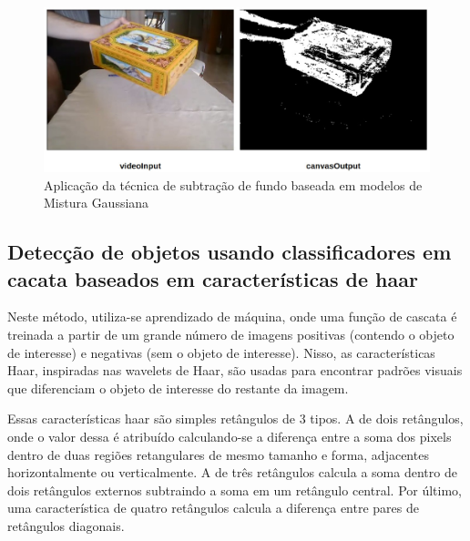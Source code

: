 \documentclass[12pt, %
openright, 
oneside, %
a4paper,    %
brazil]{facom-ufu-abntex2}
\begin{document}

\begin{figure}[ht]
	\begin{center}

		\includegraphics[width=0.7\linewidth]{background_subtraction.jpeg}
	\end{center}
	\caption{Aplicação da técnica de subtração de fundo baseada em modelos
		de Mistura Gaussiana}
\end{figure}

\subsection{Detecção de objetos usando classificadores em cacata baseados em
	características de haar}

Neste método, utiliza-se aprendizado de máquina, onde uma função de cascata é
treinada a partir de um grande número de imagens positivas (contendo o objeto
de interesse) e negativas (sem o objeto de interesse). Nisso, as
características Haar, inspiradas nas wavelets de Haar, são usadas para
encontrar padrões visuais que diferenciam o objeto de interesse do restante da
imagem.

Essas características haar são simples retângulos de 3 tipos. A de dois
retângulos, onde o valor dessa é atribuído calculando-se a diferença entre a
soma dos pixels dentro de duas regiões retangulares de mesmo tamanho e forma,
adjacentes horizontalmente ou verticalmente. A de três retângulos calcula a
soma dentro de dois retângulos externos subtraindo a soma em um retângulo
central. Por último, uma característica de quatro retângulos calcula a
diferença entre pares de retângulos diagonais.
\end{document}

